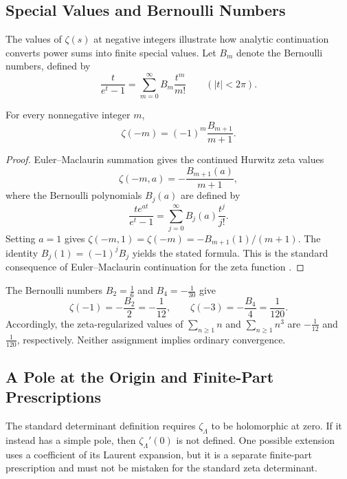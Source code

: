 \subsection{Special Values and Bernoulli Numbers}

The values of $\zeta(s)$ at negative integers illustrate how analytic continuation converts power sums into finite special values. Let $B_m$ denote the Bernoulli numbers, defined by
\[
 \frac{t}{e^t-1}=\sum_{m=0}^{\infty}B_m\frac{t^m}{m!}
 \qquad (|t|<2\pi).
\]

\begin{theorem}
For every nonnegative integer $m$,
\[
 \zeta(-m)=(-1)^m\frac{B_{m+1}}{m+1}.
\]
\end{theorem}

\begin{proof}
Euler--Maclaurin summation gives the continued Hurwitz zeta values
\[
 \zeta(-m,a)=-\frac{B_{m+1}(a)}{m+1},
\]
where the Bernoulli polynomials $B_j(a)$ are defined by
\[
 \frac{te^{at}}{e^t-1}=\sum_{j=0}^{\infty}B_j(a)\frac{t^j}{j!}.
\]
Setting $a=1$ gives $\zeta(-m,1)=\zeta(-m)=-B_{m+1}(1)/(m+1)$. The identity $B_j(1)=(-1)^jB_j$ yields the stated formula. This is the standard consequence of Euler--Maclaurin continuation for the zeta function \cite{Apostol1976-xj}.
\end{proof}

\begin{example}
The Bernoulli numbers $B_2=\tfrac16$ and $B_4=-\tfrac1{30}$ give
\[
 \zeta(-1)=-\frac{B_2}{2}=-\frac1{12},
 \qquad
 \zeta(-3)=-\frac{B_4}{4}=\frac1{120}.
\]
Accordingly, the zeta-regularized values of $\sum_{n\geq1}n$ and $\sum_{n\geq1}n^3$ are $-\tfrac1{12}$ and $\tfrac1{120}$, respectively. Neither assignment implies ordinary convergence.
\end{example}

\subsection{A Pole at the Origin and Finite-Part Prescriptions}

The standard determinant definition requires $\zeta_\Lambda$ to be holomorphic at zero. If it instead has a simple pole, then $\zeta_\Lambda'(0)$ is not defined. One possible extension uses a coefficient of its Laurent expansion, but it is a separate finite-part prescription and must not be mistaken for the standard zeta determinant.

